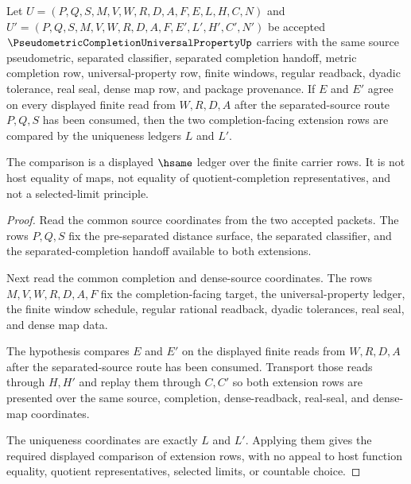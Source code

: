 \begin{theorem}
\label{thm:pseudometric-completion-universal-property-extension-uniqueness}
Let $U=(P,Q,S,M,V,W,R,D,A,F,E,L,H,C,N)$ and $U'=(P,Q,S,M,V,W,R,D,A,F,E',L',H',C',N')$ be accepted $\PseudometricCompletionUniversalPropertyUp$ carriers with the same source pseudometric, separated classifier, separated completion handoff, metric completion row, universal-property row, finite windows, regular readback, dyadic tolerance, real seal, dense map row, and package provenance. If $E$ and $E'$ agree on every displayed finite read from $W,R,D,A$ after the separated-source route $P,Q,S$ has been consumed, then the two completion-facing extension rows are compared by the uniqueness ledgers $L$ and $L'$.

The comparison is a displayed $\hsame$ ledger over the finite carrier rows. It is not host equality of maps, not equality of quotient-completion representatives, and not a selected-limit principle.
\end{theorem}
\begin{proof}
Read the common source coordinates from the two accepted packets. The rows $P,Q,S$ fix the pre-separated distance surface, the separated classifier, and the separated-completion handoff available to both extensions.

Next read the common completion and dense-source coordinates. The rows $M,V,W,R,D,A,F$ fix the completion-facing target, the universal-property ledger, the finite window schedule, regular rational readback, dyadic tolerances, real seal, and dense map data.

The hypothesis compares $E$ and $E'$ on the displayed finite reads from $W,R,D,A$ after the separated-source route has been consumed. Transport those reads through $H,H'$ and replay them through $C,C'$ so both extension rows are presented over the same source, completion, dense-readback, real-seal, and dense-map coordinates.

The uniqueness coordinates are exactly $L$ and $L'$. Applying them gives the required displayed comparison of extension rows, with no appeal to host function equality, quotient representatives, selected limits, or countable choice.
\end{proof}


